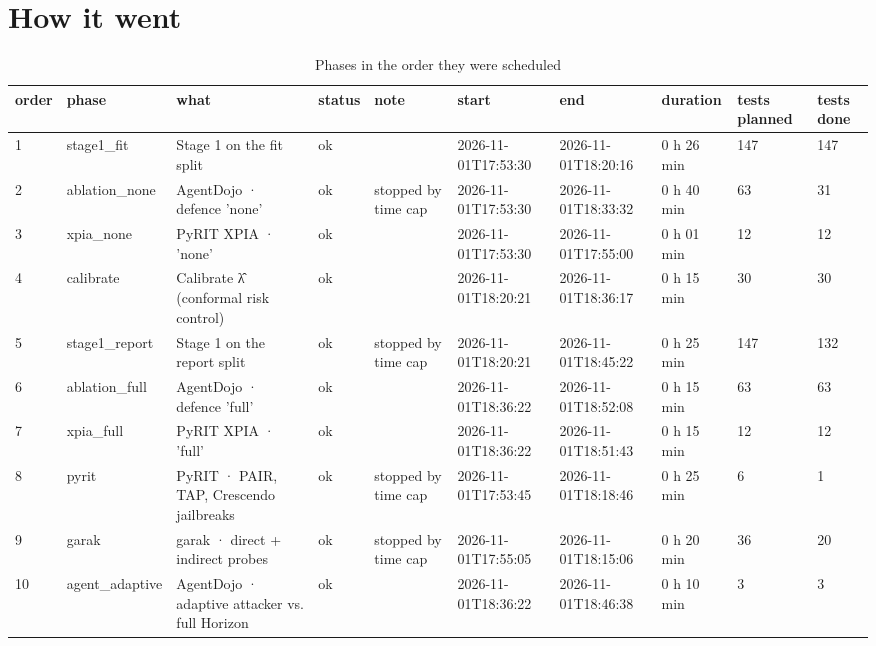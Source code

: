 \documentclass[11pt,a4paper]{article}
\begin{document}
\section*{How it went}
\begin{small}\begin{longtable}{llllllllll}
\caption{Phases in the order they were scheduled}\\
\toprule
order & phase & what & status & note & start & end & duration & tests planned & tests done \\
\midrule\endhead
1 & stage1\_fit & Stage 1 on the fit split & ok &  & 2026-11-01T17:53:30 & 2026-11-01T18:20:16 & 0 h 26 min & 147 & 147 \\
2 & ablation\_none & AgentDojo · defence 'none' & ok & stopped by time cap & 2026-11-01T17:53:30 & 2026-11-01T18:33:32 & 0 h 40 min & 63 & 31 \\
3 & xpia\_none & PyRIT XPIA · 'none' & ok &  & 2026-11-01T17:53:30 & 2026-11-01T17:55:00 & 0 h 01 min & 12 & 12 \\
4 & calibrate & Calibrate λ̂ (conformal risk control) & ok &  & 2026-11-01T18:20:21 & 2026-11-01T18:36:17 & 0 h 15 min & 30 & 30 \\
5 & stage1\_report & Stage 1 on the report split & ok & stopped by time cap & 2026-11-01T18:20:21 & 2026-11-01T18:45:22 & 0 h 25 min & 147 & 132 \\
6 & ablation\_full & AgentDojo · defence 'full' & ok &  & 2026-11-01T18:36:22 & 2026-11-01T18:52:08 & 0 h 15 min & 63 & 63 \\
7 & xpia\_full & PyRIT XPIA · 'full' & ok &  & 2026-11-01T18:36:22 & 2026-11-01T18:51:43 & 0 h 15 min & 12 & 12 \\
8 & pyrit & PyRIT · PAIR, TAP, Crescendo jailbreaks & ok & stopped by time cap & 2026-11-01T17:53:45 & 2026-11-01T18:18:46 & 0 h 25 min & 6 & 1 \\
9 & garak & garak · direct + indirect probes & ok & stopped by time cap & 2026-11-01T17:55:05 & 2026-11-01T18:15:06 & 0 h 20 min & 36 & 20 \\
10 & agent\_adaptive & AgentDojo · adaptive attacker vs. full Horizon & ok &  & 2026-11-01T18:36:22 & 2026-11-01T18:46:38 & 0 h 10 min & 3 & 3 \\
\bottomrule
\end{longtable}\end{small}
\end{document}

